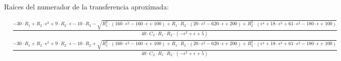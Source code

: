 Raíces del numerador de la transferencia aproximada:
\begin{ssmall}
\begin{align}
    &\frac{-30 \cdot R_1 + R_2 \cdot \epsilon^2 + 9 \cdot R_2 \cdot \epsilon - 10 \cdot R_2 - \sqrt{R_1^2 \cdot \left(160 \cdot \epsilon^2 - 160 \cdot \epsilon + 100\right) + R_1 \cdot R_2 \cdot \left(20 \cdot \epsilon^2 - 620 \cdot \epsilon + 200\right) + R_2^2 \cdot \left(\epsilon^4 + 18 \cdot \epsilon^3 + 61 \cdot \epsilon^2 - 180 \cdot \epsilon + 100\right)}}{40 \cdot C_2 \cdot R_1 \cdot R_2 \cdot (-\epsilon^2 + \epsilon + 5)} \\
    &\frac{-30 \cdot R_1 + R_2 \cdot \epsilon^2 + 9 \cdot R_2 \cdot \epsilon - 10 \cdot R_2 + \sqrt{R_1^2 \cdot \left(160 \cdot \epsilon^2 - 160 \cdot \epsilon + 100\right) + R_1 \cdot R_2 \cdot \left(20 \cdot \epsilon^2 - 620 \cdot \epsilon + 200\right) + R_2^2 \cdot \left(\epsilon^4 + 18 \cdot \epsilon^3 + 61 \cdot \epsilon^2 - 180 \cdot \epsilon + 100\right)}}{40 \cdot C_2 \cdot R_1 \cdot R_2 \cdot (-\epsilon^2 + \epsilon + 5)} 
    \label{eq:ej5_num_roots_simplyfied_system}
\end{align}
\end{ssmall}


